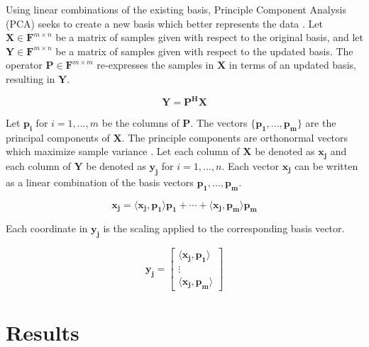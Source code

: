 \documentclass[conference]{IEEEtran}
\begin{document}
    Using linear combinations of the existing basis, Principle Component Analysis (PCA) seeks to create a new basis which better represents the data \cite{shlens_2014_tutorial}. Let $\mathbf{X} \in \mathbf{F}^{m \times n}$ be a matrix of samples given with respect to the original basis, and let $\mathbf{Y} \in \mathbf{F}^{m \times n}$ be a matrix of samples given with respect to the updated basis. The operator $\mathbf{P} \in \mathbf{F}^{m \times m}$ re-expresses the samples in $\mathbf{X}$ in terms of an updated basis, resulting in $\mathbf{Y}$.
    
    \begin{equation}
    		\mathbf{Y} = \mathbf{P^{H}X}
    \end{equation}
    
    Let $\mathbf{p_i}$ for $i = 1,...,m$ be the columns of $\mathbf{P}$. The vectors $\{\mathbf{p_1},...,\mathbf{p_m}\}$ are the principal components of $\mathbf{X}$. The principle components are orthonormal vectors which maximize sample variance \cite{shlens_2014_tutorial}. Let each column of $\mathbf{X}$ be denoted as $\mathbf{x_j}$ and each column of $\mathbf{Y}$ be denoted as $\mathbf{y_j}$ for $i = 1,...,n$. Each vector $\mathbf{x_j}$ can be written as a linear combination of the basis vectors $\mathbf{p_1},...,\mathbf{p_m}$.
    
    \begin{equation}
    		\mathbf{x_j} = \langle \mathbf{x_j}, \mathbf{p_1}\rangle \mathbf{p_1} + \cdots + \langle \mathbf{x_j}, \mathbf{p_m}\rangle \mathbf{p_m}
    	\end{equation}
    	
    	Each coordinate in $\mathbf{y_j}$ is the scaling applied to the corresponding basis vector.
    	
    	\begin{equation}
    		\mathbf{y_j} = \begin{bmatrix}
    			\langle \mathbf{x_j}, \mathbf{p_1} \rangle\\
    			\vdots \\
    			\langle \mathbf{x_j}, \mathbf{p_m}\rangle
    		\end{bmatrix}
    	\end{equation}
    	


    \section{Results}
\end{document}
